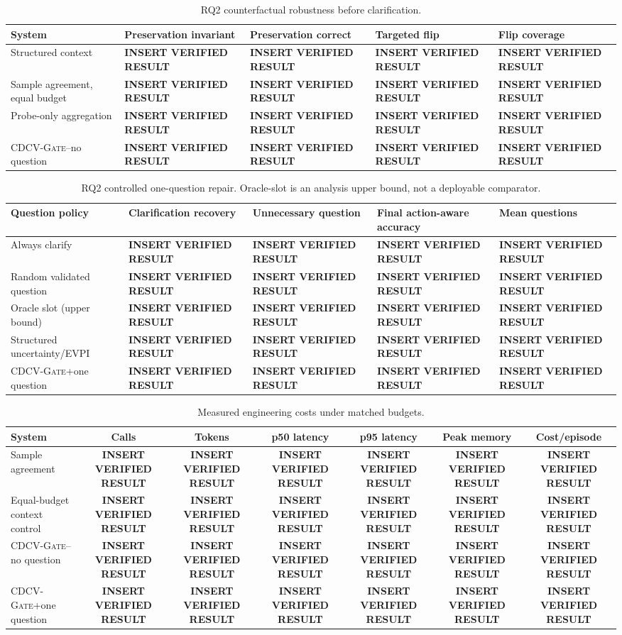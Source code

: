 \documentclass[preprint,12pt,authoryear]{elsarticle}
\newif\ifresultslocked
\newcommand{\cdcv}{\textsc{CDCV-Gate}}
\newcommand{\resultcell}{\ifresultslocked\texttt{RESULTS\_LOCKED}\else
  \textbf{INSERT VERIFIED RESULT}\fi}
\begin{document}
\begin{table}[t]
\centering
\caption{RQ2 counterfactual robustness before clarification.}
\label{tab:rq2}
\small
\begin{tabularx}{\linewidth}{lXXXX}
\toprule
System & Preservation invariant & Preservation correct & Targeted flip & Flip coverage \\
\midrule
Structured context & \resultcell & \resultcell & \resultcell & \resultcell \\
Sample agreement, equal budget & \resultcell & \resultcell & \resultcell & \resultcell \\
Probe-only aggregation & \resultcell & \resultcell & \resultcell & \resultcell \\
\cdcv{}--no question & \resultcell & \resultcell & \resultcell & \resultcell \\
\bottomrule
\end{tabularx}
\end{table}

\begin{table}[t]
\centering
\caption{RQ2 controlled one-question repair. Oracle-slot is an analysis upper
bound, not a deployable comparator.}
\label{tab:repair}
\small
\begin{tabularx}{\linewidth}{lXXXX}
\toprule
Question policy & Clarification recovery & Unnecessary question & Final action-aware accuracy & Mean questions \\
\midrule
Always clarify & \resultcell & \resultcell & \resultcell & \resultcell \\
Random validated question & \resultcell & \resultcell & \resultcell & \resultcell \\
Oracle slot (upper bound) & \resultcell & \resultcell & \resultcell & \resultcell \\
Structured uncertainty/EVPI & \resultcell & \resultcell & \resultcell & \resultcell \\
\cdcv{}+one question & \resultcell & \resultcell & \resultcell & \resultcell \\
\bottomrule
\end{tabularx}
\end{table}

\begin{table}[t]
\centering
\caption{Measured engineering costs under matched budgets.}
\label{tab:cost}
\small
\begin{tabular}{lcccccc}
\toprule
System & Calls & Tokens & p50 latency & p95 latency & Peak memory & Cost/episode \\
\midrule
Sample agreement & \resultcell & \resultcell & \resultcell & \resultcell & \resultcell & \resultcell \\
Equal-budget context control & \resultcell & \resultcell & \resultcell & \resultcell & \resultcell & \resultcell \\
\cdcv{}--no question & \resultcell & \resultcell & \resultcell & \resultcell & \resultcell & \resultcell \\
\cdcv{}+one question & \resultcell & \resultcell & \resultcell & \resultcell & \resultcell & \resultcell \\
\bottomrule
\end{tabular}
\end{table}
\end{document}
